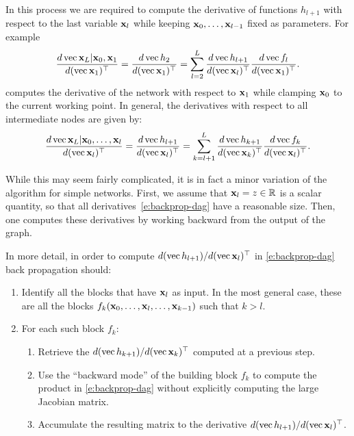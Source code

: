 In this process we are required to compute the derivative of functions $h_{l+1}$ with respect to the last variable $\mathbf{x}_l$ while keeping $\mathbf{x}_0,\dots,\mathbf{x}_{l-1}$ fixed as parameters. For example
\[
\frac{d \operatorname{vec} \mathbf{x}_L|\mathbf{x}_0,\mathbf{x}_1}{d(\operatorname{vec} \mathbf{x}_1)^\top}
=
\frac{d \operatorname{vec} h_2}{d(\operatorname{vec} \mathbf{x}_1)^\top}
=
\sum_{l=2}^L
\frac{d\operatorname{vec} h_{l+1}}{d(\operatorname{vec} \mathbf{x}_l)^\top}
\frac{d\operatorname{vec} f_l}{d(\operatorname{vec} \mathbf{x}_1)^\top}.
\]
computes the derivative of the network with respect to $\mathbf{x}_1$ while clamping $\mathbf{x}_0$ to the current working point. In general, the derivatives with respect to all intermediate nodes are given by:
\begin{equation}\label{e:backprop-dag}
\frac{d \operatorname{vec} \mathbf{x}_L|\mathbf{x}_0,\dots,\mathbf{x}_{l}}{d(\operatorname{vec} \mathbf{x}_l)^\top}
=
\frac{d \operatorname{vec} h_{l+1}}{d(\operatorname{vec} \mathbf{x}_l)^\top}
=
\sum_{k=l+1}^L
\frac{d\operatorname{vec} h_{k+1}}{d(\operatorname{vec} \mathbf{x}_k)^\top}
\frac{d\operatorname{vec} f_k}{d(\operatorname{vec} \mathbf{x}_l)^\top}.	
\end{equation}

While this may seem fairly complicated, it is in fact a minor variation of the algorithm for simple networks. First, we assume that $\mathbf{x}_l = z \in \mathbb{R}$ is a scalar quantity, so that all derivatives~\eqref{e:backprop-dag} have a reasonable size. Then, one computes these derivatives by working backward from the output of the graph.

In more detail, in order to compute ${d (\operatorname{vec} h_{l+1})}/{d(\operatorname{vec} \mathbf{x}_l)^\top}$ in \eqref{e:backprop-dag} back propagation should:
\begin{enumerate}
    \item Identify all the blocks that have $\mathbf{x}_l$ as input. In the most general case, these are all the blocks $f_{k}(\mathbf{x}_0,\dots,\mathbf{x}_l,\dots,\mathbf{x}_{k-1})$ such that $k > l$.
    \item For each such block $f_{k}$:
	\begin{enumerate}
	\item Retrieve the $d(\operatorname{vec} h_{k+1} )/d(\operatorname{vec} \mathbf{x}_{k})^\top$ computed at a previous step.
	\item Use the ``backward mode'' of the building block $f_k$ to compute the product in \eqref{e:backprop-dag} without explicitly computing the large Jacobian matrix.
	\item Accumulate the resulting matrix to the derivative ${d (\operatorname{vec} h_{l+1})}/{d(\operatorname{vec} \mathbf{x}_l)^\top}$.
	\end{enumerate}
\end{enumerate}

